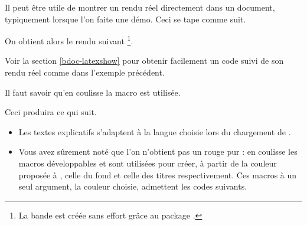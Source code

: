 \begin{bdocexa}
    Il peut être utile de montrer un rendu réel directement dans un document, typiquement lorsque l'on faite une démo.
    Ceci se tape comme suit.


    On obtient alors le rendu suivant
    \footnote{
        La bande est créée sans effort grâce au package .
    }.

    \medskip

    
\end{bdocexa}


\begin{bdocrem}
    Voir la section \ref{bdoc-latexshow} pour obtenir facilement un code suivi de son rendu réel comme dans l'exemple précédent.
\end{bdocrem}


\begin{bdocnote}
    Il faut savoir qu'en coulisse la macro  est utilisée.

    \begin{bdoclatex}[std]
    \end{bdoclatex}
\end{bdocnote}




\begin{bdocexa}
    \leavevmode


    Ceci produira ce qui suit.

    \medskip

    
\end{bdocexa}


\begin{bdocnote}
    \leavevmode

    \begin{itemize}
        \item Les textes explicatifs s'adaptent à la langue choisie lors du chargement de .

        \item Vous avez sûrement noté que l'on n'obtient pas un rouge pur : en coulisse les macros développables  et  sont utilisées pour créer, à partir de la couleur proposée à , celle du fond et celle des titres respectivement.
              Ces macros à un seul argument, la couleur choisie, admettent les codes suivants.

              \begin{bdoclatex}[code]
              \end{bdoclatex}
    \end{itemize}
\end{bdocnote}


